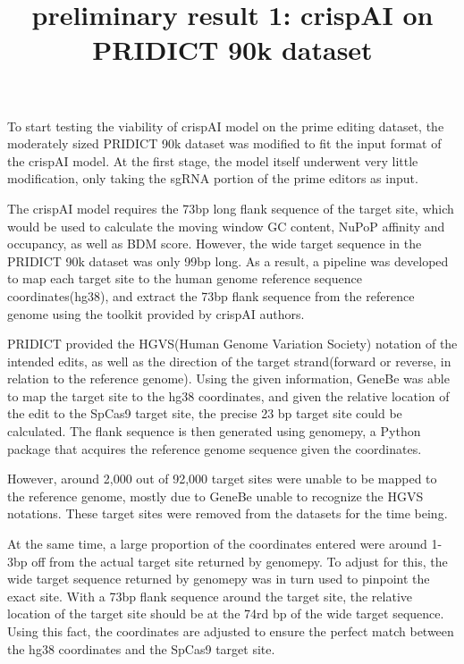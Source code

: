\documentclass[a4,12pt]{article}
\title{preliminary result 1: crispAI on PRIDICT 90k dataset}
\author{}
\date{}
\begin{document}
\maketitle

To start testing the viability of crispAI model on the prime editing dataset, the moderately sized PRIDICT 90k dataset was modified to fit the input format of the crispAI model. At the first stage, the model itself underwent very little modification, only taking the sgRNA portion of the prime editors as input. 

The crispAI model requires the 73bp long flank sequence of the target site, which would be used to calculate the moving window GC content, NuPoP affinity and occupancy, as well as BDM score\cite{stortzPiCRISPRPhysicallyInformed2023}. However, the wide target sequence in the PRIDICT 90k dataset was only 99bp long. As a result, a pipeline was developed to map each target site to the human genome reference sequence coordinates(hg38), and extract the 73bp flank sequence from the reference genome using the toolkit provided by crispAI authors.

PRIDICT provided the HGVS(Human Genome Variation Society) notation of the intended edits, as well as the direction of the target strand(forward or reverse, in relation to the reference genome). Using the given information, GeneBe was able to map the target site to the hg38 coordinates, and given the relative location of the edit to the SpCas9 target site, the precise 23 bp target site could be calculated\cite{stawinskiGenebenetImplementationValidation2024}. The flank sequence is then generated using genomepy, a Python package that acquires the reference genome sequence given the coordinates.

However, around 2,000 out of 92,000 target sites were unable to be mapped to the reference genome, mostly due to GeneBe unable to recognize the HGVS notations. These target sites were removed from the datasets for the time being. 

At the same time, a large proportion of the coordinates entered were around 1-3bp off from the actual target site returned by genomepy. To adjust for this, the wide target sequence returned by genomepy was in turn used to pinpoint the exact site. With a 73bp flank sequence around the target site, the relative location of the target site should be at the 74rd bp of the wide target sequence. Using this fact, the coordinates are adjusted to ensure the perfect match between the hg38 coordinates and the SpCas9 target site.
\end{document}
